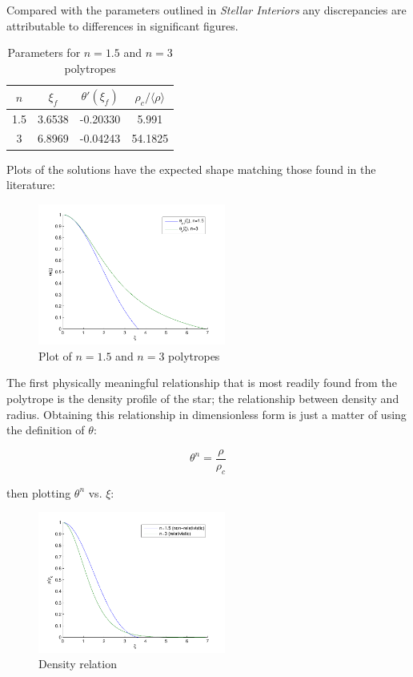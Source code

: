 \documentclass[twoside]{article}
\begin{document}
\begin{multicols}{2}
Compared with the parameters outlined in \textit{Stellar
Interiors}\cite{hansen2004} any discrepancies are attributable to differences in
significant figures.

\begin{table}[H]
\caption{Parameters for \(n=1.5\) and \(n=3\) polytropes\cite[p.340]{hansen2004}}
\centering
\begin{tabular}{c | c c c}
\toprule
\(n\) & \(\xi_f\) & \(\theta'(\xi_f)\) & \(\rho_c/\langle \rho \rangle\) \\
\midrule
1.5 & 3.6538 & -0.20330 & 5.991 \\
3 & 6.8969 & -0.04243 & 54.1825 \\
\bottomrule
\end{tabular}
\end{table}

Plots of the solutions have the expected shape matching those found in the
literature\cite{hansen2004}\cite{leblanc2010}\cite{jardetsky1958}:

\begin{figure}[H]
    \caption{Plot of \(n=1.5\) and \(n=3\) polytropes}
    \includegraphics[width=0.55\textwidth]{lesolution.pdf}
\end{figure}

The first physically meaningful relationship that is most readily found from the
polytrope is the density profile of the star; the relationship between density
and radius. Obtaining this relationship in dimensionless form is just a matter
of using the definition of \(\theta\):

    \begin{equation}
        \theta^n=\frac{\rho}{\rho_c}
    \end{equation}

then plotting \(\theta^n\) vs. \(\xi\):

\begin{figure}[H]
    \caption{Density relation}
    \includegraphics[width=0.55\textwidth]{density.pdf}
\end{figure}


\end{multicols}
\end{document}
